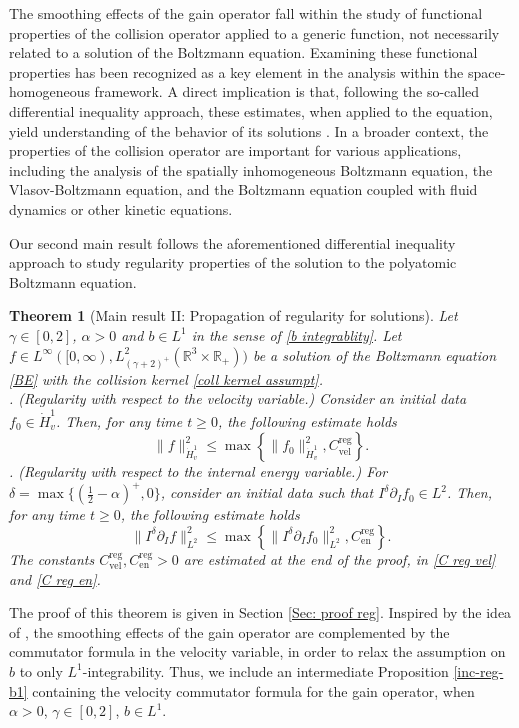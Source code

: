 \documentclass[11pt,a4paper]{amsart}
\newcommand{\bRp}{\mathbb{R}_+}
\newcommand{\bRfp}{\mathbb{R}^3 \times \bRp}
\newcommand{\g}{\gamma}
\newcommand{\Crgvel}{C_{\text{vel}}^{\text{reg}}}
\newcommand{\Crgen}{C_{\text{en}}^{\text{reg}}}
\newtheorem{theorem}{Theorem}
\begin{document}
 
 
 
 The smoothing effects of the gain operator fall within the study of functional properties of the collision operator applied to a generic function, not necessarily related to a solution of the Boltzmann equation. Examining these functional properties has been recognized as a key element in the analysis within the space-homogeneous framework. A direct implication is that, following the so-called  differential inequality  approach, these estimates, when applied to the equation, yield understanding of the behavior of its solutions \cite{MV}. In a broader context, the properties of the collision operator are important for various applications, including the analysis of the spatially inhomogeneous Boltzmann equation, the Vlasov-Boltzmann equation, and the Boltzmann equation coupled with fluid dynamics or other kinetic equations.
 
Our second main result follows the aforementioned  differential inequality  approach to study regularity properties of the solution to the polyatomic Boltzmann equation. 

\begin{theorem}[Main result II: Propagation of regularity for solutions]\label{Th regularity}
Let $\g \in [0,2]$, $\alpha>0$ and $b\in L^1$  in the sense of \eqref{b integrablity}.  Let $f \in L^\infty([0,\infty), L^2_{(\gamma+2)^+}(\bRfp) )$ be a solution of the Boltzmann equation \eqref{BE} with  the collision kernel \eqref{coll kernel assumpt}. \\
. (Regularity with respect to the velocity variable.) Consider an initial data
$ f_0  \in \dot{H}^{1}_{v}$. Then, for any time $t\geq0$, the following estimate holds
\begin{equation}\label{regularity v}
	\| f \|_{\dot{H}^{1}_{v}}^2  \leq  \max \left\{ \| f_0 \|_{\dot{H}^{1}_{v}}^2, \Crgvel \right\}.  
\end{equation}
. (Regularity with respect to the internal energy variable.) 	 For  $\delta=\max\{ \left(\frac{1}{2} - \alpha\right)^+,0\}$, consider an initial data such that
$ I^{\delta} \partial_{I} f_0\in {{L}^{2}}$. Then, for any time $t\geq0$, the following estimate holds
	\begin{equation}\label{regularity I}
	\| I^{\delta} \partial_{I} f \|_{{L}^{2}}^2 \leq     \max \left\{    \| I^{\delta} \partial_{I} f_0 \|_{{L}^{2}}^2, \Crgen \right\}.
\end{equation}
The constants  $\Crgvel, \Crgen>0$ are estimated at the end of the proof, in \eqref{C reg vel} and \eqref{C reg en}.
\end{theorem}
The proof of this theorem is given in Section \ref{Sec: proof reg}. Inspired by the idea of \cite{AGT}, the smoothing effects of the gain operator   are complemented by the commutator formula in the velocity variable, in order to relax the assumption on $b$ to only $L^1$-integrability. Thus, we include an intermediate Proposition \ref{inc-reg-b1} containing the velocity commutator formula for the gain operator, when $\alpha>0$, $\g \in [0,2]$, $b\in L^1$. 
\end{document}
